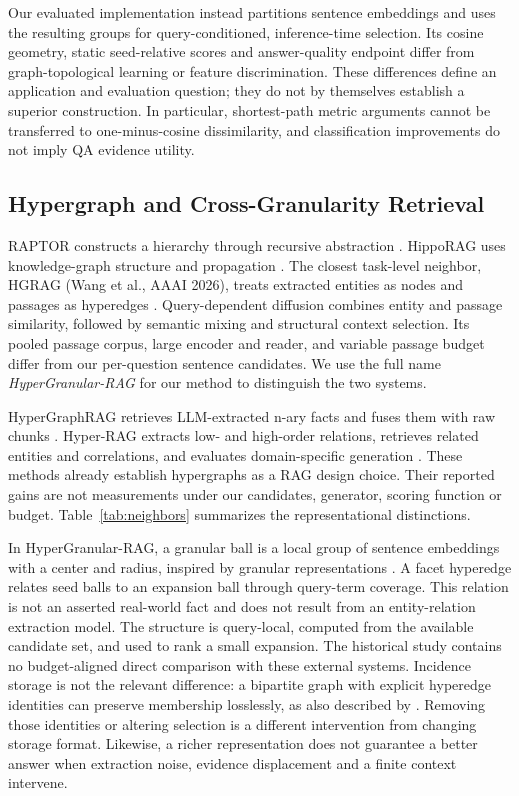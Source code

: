 \documentclass[11pt,a4paper]{article}
\newcommand{\hgrag}{HyperGranular-RAG\xspace}
\begin{document}
Our evaluated implementation instead partitions sentence embeddings and
uses the resulting groups for query-conditioned, inference-time selection.
Its cosine geometry, static seed-relative scores and answer-quality endpoint
differ from graph-topological learning or feature discrimination. These
differences define an application and evaluation question; they do not by
themselves establish a superior construction. In particular, shortest-path
metric arguments cannot be transferred to one-minus-cosine dissimilarity,
and classification improvements do not imply QA evidence utility.

\subsection{Hypergraph and Cross-Granularity Retrieval}
RAPTOR constructs a hierarchy through recursive abstraction
\citep{sarthi2024raptor}. HippoRAG uses knowledge-graph structure and
propagation \citep{gutierrez2024hipporag}. The closest task-level neighbor,
HGRAG (Wang et al., AAAI 2026), treats extracted entities as nodes and
passages as hyperedges \citep{wang2026crossgranularity}. Query-dependent
diffusion combines entity and passage similarity, followed by semantic
mixing and structural context selection. Its pooled passage corpus, large
encoder and reader, and variable passage budget differ from our per-question
sentence candidates. We use the full name \emph{HyperGranular-RAG} for our
method to distinguish the two systems.

HyperGraphRAG retrieves LLM-extracted n-ary facts and fuses them with raw
chunks \citep{luo2025hypergraphrag}. Hyper-RAG extracts low- and high-order
relations, retrieves related entities and correlations, and evaluates
domain-specific generation \citep{feng2026hyperrag}. These methods already
establish hypergraphs as a RAG design choice. Their reported gains are not
measurements under our candidates, generator, scoring function or budget.
Table~\ref{tab:neighbors} summarizes the representational distinctions.

In \hgrag, a granular ball is a local group of sentence embeddings with a
center and radius, inspired by granular representations
\citep{xia2019granularball}. A facet hyperedge relates seed balls to an
expansion ball through query-term coverage. This relation is not an asserted
real-world fact and does not result from an entity-relation extraction model.
The structure is query-local, computed from the available candidate set, and
used to rank a small expansion. The historical study contains no
budget-aligned direct comparison with these external systems.
Incidence storage is not the relevant difference: a bipartite graph with
explicit hyperedge identities can preserve membership losslessly, as also
described by \citet{luo2025hypergraphrag}. Removing those identities or
altering selection is a different intervention from changing storage format.
Likewise, a richer representation does not guarantee a better answer when
extraction noise, evidence displacement and a finite context intervene.
\end{document}
